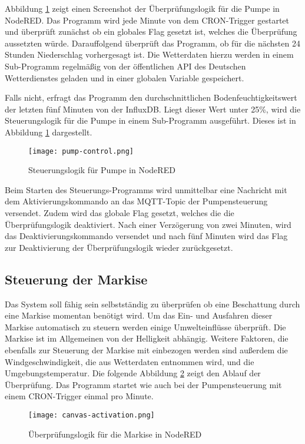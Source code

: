 Abbildung \ref{fig:pump-activation} zeigt einen Screenshot der Überprüfungslogik für die Pumpe in NodeRED.
Das Programm wird jede Minute von dem CRON-Trigger gestartet und überprüft zunächst ob ein globales Flag gesetzt ist, welches die Überprüfung aussetzten würde.
Darauffolgend überprüft das Programm, ob für die nächsten 24 Stunden Niederschlag vorhergesagt ist.
Die Wetterdaten hierzu werden in einem Sub-Programm regelmäßig von der öffentlichen API des Deutschen Wetterdienstes geladen und in einer globalen Variable gespeichert.

Falls nicht, erfragt das Programm den durchschnittlichen Bodenfeuchtigkeitswert der letzten fünf Minuten von der InfluxDB.
Liegt dieser Wert unter 25\%, wird die Steuerungslogik für die Pumpe in einem Sub-Programm ausgeführt.
Dieses ist in Abbildung \ref{fig:pump-activation} dargestellt.

\begin{figure}[h]
  \centering
  \texttt{[image: pump-control.png]}
  \caption{Steuerungslogik für Pumpe in NodeRED}\label{fig:pump-activation}
\end{figure}

Beim Starten des Steuerungs-Programms wird unmittelbar eine Nachricht mit dem Aktivierungskommando an das MQTT-Topic der Pumpensteuerung versendet.
Zudem wird das globale Flag gesetzt, welches die die Überprüfungslogik deaktiviert.
Nach einer Verzögerung von zwei Minuten, wird das Deaktivierungskommando versendet und nach fünf Minuten wird das Flag zur Deaktivierung der Überprüfungslogik wieder zurückgesetzt.

\subsection{Steuerung der Markise}
Das System soll fähig sein selbstständig zu überprüfen ob eine Beschattung durch eine Markise momentan benötigt wird. Um  das Ein- und Ausfahren dieser Markise automatisch zu steuern werden einige Umwelteinflüsse überprüft. Die Markise ist im Allgemeinen von der Helligkeit abhängig. Weitere Faktoren, die ebenfalls zur Steuerung der Markise mit einbezogen werden sind außerdem die Windgeschwindigkeit, die aus Wetterdaten entnommen wird, und die Umgebungstemperatur. 
Die folgende Abbildung \ref{fig:canvas-activation} zeigt den Ablauf der Überprüfung. Das Programm startet wie auch bei der Pumpensteuerung mit einem CRON-Trigger einmal pro Minute.

\begin{figure}[h]
  \centering
  \texttt{[image: canvas-activation.png]}
  \caption{Überprüfungslogik für die Markise in NodeRED}\label{fig:canvas-activation}
\end{figure}

